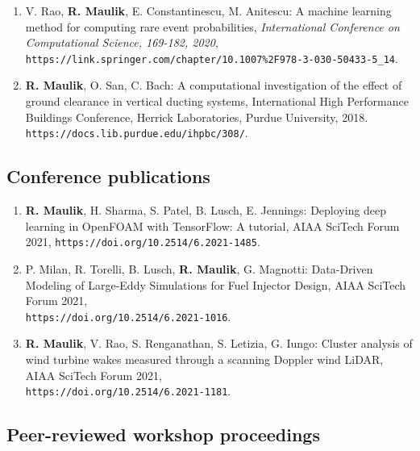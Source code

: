 \documentclass[letterpaper]{article}
\begin{document}
\begin{enumerate}
\item V. Rao, \textbf{R. Maulik}, E. Constantinescu, M. Anitescu: A machine learning method for computing rare event probabilities, {\it International Conference on Computational Science, 169-182, 2020}, \\ \texttt{https://link.springer.com/chapter/10.1007\%2F978-3-030-50433-5\_14}. 

\item \textbf{R. Maulik}, O. San, C. Bach: A computational investigation of the effect of ground clearance in vertical ducting systems, International High Performance Buildings Conference, Herrick Laboratories, Purdue University, 2018. \\ \texttt{https://docs.lib.purdue.edu/ihpbc/308/}.

\end{enumerate}

\subsection*{Conference publications}

\begin{enumerate}

\item \textbf{R. Maulik}, H. Sharma, S. Patel, B. Lusch, E. Jennings: Deploying deep learning in OpenFOAM with TensorFlow: A tutorial, AIAA SciTech Forum 2021, \texttt{https://doi.org/10.2514/6.2021-1485}.

\item P. Milan, R. Torelli, B. Lusch, \textbf{R. Maulik}, G. Magnotti: Data-Driven Modeling of Large-Eddy Simulations for Fuel Injector Design, AIAA SciTech Forum 2021, \\ \texttt{https://doi.org/10.2514/6.2021-1016}.

\item \textbf{R. Maulik}, V. Rao, S. Renganathan, S. Letizia, G. Iungo: Cluster analysis of wind turbine wakes measured through a scanning Doppler wind LiDAR, AIAA SciTech Forum 2021, \\ \texttt{https://doi.org/10.2514/6.2021-1181}.

\end{enumerate}

\subsection*{Peer-reviewed workshop proceedings}
\end{document}
